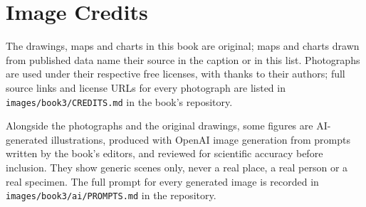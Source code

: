 \chapter*{Image Credits}

The drawings, maps and charts in this book are original; maps and charts
drawn from published data name their source in the caption or in this
list. Photographs are used under their respective free licenses, with
thanks to their authors; full source links and license URLs for every
photograph are listed in \texttt{images/book3/CREDITS.md} in the book's
repository.

\bigskip
Alongside the photographs and the original drawings, some figures are
AI-generated illustrations, produced with OpenAI image generation from
prompts written by the book's editors, and reviewed for scientific
accuracy before inclusion. They show generic scenes only, never a real
place, a real person or a real specimen. The full prompt for every
generated image is recorded in \texttt{images/book3/ai/PROMPTS.md} in the
repository.

